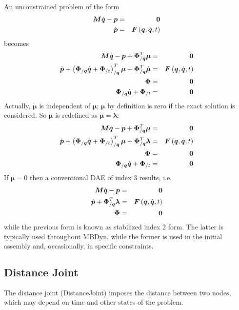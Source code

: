 \documentclass[10pt,dvips,fleqn,subeqn]{report}
\newcommand{\T}[1]{\boldsymbol{#1}}
\begin{document}
An unconstrained problem of the form
\begin{eqnarray*}
	\T{M} \dot{\T{q}} - \T{p} & = & \T{0} \\
	\dot{\T{p}} & = & \T{F}\plbr{\T{q}, \dot{\T{q}}, t}
\end{eqnarray*}
becomes
\begin{eqnarray*}
	\T{M} \dot{\T{q}} - \T{p} + \T{\Phi}_{/\T{q}}^T \T{\mu} & = & \T{0} \\
	\dot{\T{p}} + \plbr{
		\T{\Phi}_{/\T{q}} \dot{\T{q}}
		+ \T{\Phi}_{/t}
	}_{/\T{q}}^T \T{\mu}
	+ \T{\Phi}_{/\T{q}}^T \dot{\T{\mu}} & = & \T{F}\plbr{\T{q}, \dot{\T{q}}, t} \\
	\T{\Phi} & = & \T{0} \\
	\T{\Phi}_{/\T{q}} \dot{\T{q}} + \T{\Phi}_{/t} & = & \T{0}
\end{eqnarray*}
Actually, $\dot{\T{\mu}}$ is independent of $\T{\mu}$;
$\T{\mu}$ by definition is zero if the exact solution is considered.
So $\dot{\T{\mu}}$ is redefined as $\dot{\T{\mu}}=\T{\lambda}$:
\begin{eqnarray*}
	\T{M} \dot{\T{q}} - \T{p} + \T{\Phi}_{/\T{q}}^T \T{\mu} & = & \T{0} \\
	\dot{\T{p}} + \plbr{
		\T{\Phi}_{/\T{q}} \dot{\T{q}}
		+ \T{\Phi}_{/t}
	}_{/\T{q}}^T \T{\mu} + \T{\Phi}_{/\T{q}}^T \T{\lambda}
		& = & \T{F}\plbr{\T{q}, \dot{\T{q}}, t} \\
	\T{\Phi} & = & \T{0} \\
	\T{\Phi}_{/\T{q}} \dot{\T{q}} + \T{\Phi}_{/t} & = & \T{0}
\end{eqnarray*}
If $\T{\mu}=0$ then a conventional DAE of index 3 results, i.e.
\begin{eqnarray*}
	\T{M} \dot{\T{q}} - \T{p} & = & \T{0} \\
	\dot{\T{p}} + \T{\Phi}_{/\T{q}}^T \T{\lambda}
		& = & \T{F}\plbr{\T{q}, \dot{\T{q}}, t} \\
	\T{\Phi} & = & \T{0}
\end{eqnarray*}
while the previous form is known as stabilized index 2 form.
The latter is typically used throughout MBDyn, while the former is used 
in the initial assembly and, occasionally, in specific constraints.

\subsection{Distance Joint}
\label{sec:DistanceJoint}
The distance joint (DistanceJoint) imposes the distance between two nodes,
which may depend on time and other states of the problem.
\end{document}

